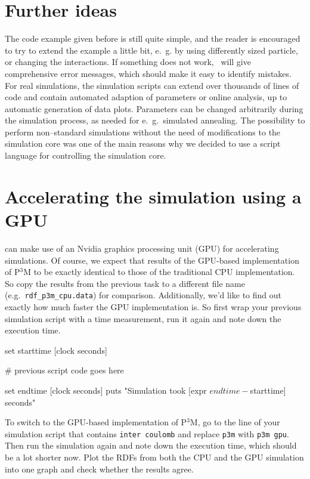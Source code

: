 \documentclass[
a4paper,                        %
11pt,                           %
twoside,                        %
footsepline,                    %
headsepline,                    %
headexclude,                    %
footexclude,                    %
pagesize,                       %
]{scrartcl}
\begin{document}
\section{Further ideas}

The code example given before is still quite simple, and the reader is
encouraged to try to extend the example a little bit, e.~g. by using
differently sized particle, or changing the interactions. If something
does not work, \es\ will give comprehensive error messages, which
should make it easy to identify mistakes. For real simulations, the
simulation scripts can extend over thousands of lines of code and
contain automated adaption of parameters or online analysis, up to
automatic generation of data plots.  Parameters can be changed
arbitrarily during the simulation process, as needed for e.~g.\
simulated annealing. The possibility to perform non--standard
simulations without the need of modifications to the simulation core
was one of the main reasons why we decided to use a script language
for controlling the simulation core.

\section{Accelerating the simulation using a GPU}

\es{} can make use of an Nvidia graphics processing unit (GPU) for 
accelerating simulations.
Of course, we expect that results of the GPU-based implementation of
P$^3$M to be exactly identical to those of the traditional CPU
implementation. So copy the results from the previous task to a
different file name (e.g.~\verb|rdf_p3m_cpu.data|) for comparison.
Additionally, we'd like to find out exactly how much faster the GPU
implementation is. So first wrap your previous simulation script with
a time measurement, run it again and note down the execution time.
\begin{tclcode}
	set starttime [clock seconds]
	
	# previous script code goes here
	
	set endtime [clock seconds]
	puts "Simulation took [expr $endtime-$starttime] seconds"	
\end{tclcode}

To switch to the GPU-based implementation of 
P$^3$M, go to the line of your simulation script that contains
\verb|inter coulomb| and replace \verb|p3m| with \verb|p3m gpu|.
Then run the simulation again and note down the execution time,
which should be a lot shorter now. Plot the RDFs from both
the CPU and the GPU simulation into one graph and check whether the
results agree.
\end{document}

